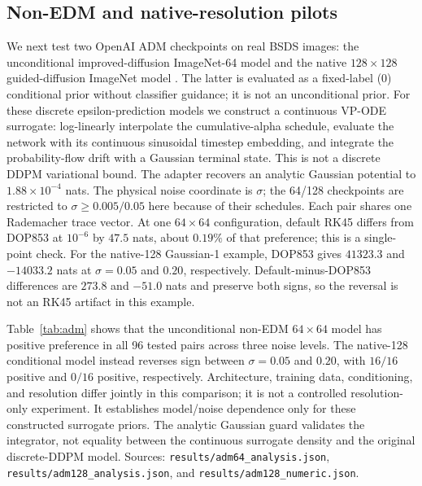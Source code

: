 \documentclass[10pt,journal]{IEEEtran}
\begin{document}
\subsection{Non-EDM and native-resolution pilots}
\label{sec:adm}

We next test two OpenAI ADM checkpoints on real BSDS images: the unconditional
improved-diffusion ImageNet-64 model \cite{nichol2021improved} and the native $128\times128$
guided-diffusion ImageNet model \cite{dhariwal2021diffusion}. The latter is evaluated as a
fixed-label (0) conditional prior without classifier guidance; it is not an unconditional prior.
For these discrete epsilon-prediction models we construct a continuous VP-ODE surrogate:
log-linearly interpolate the cumulative-alpha schedule, evaluate the network with its continuous
sinusoidal timestep embedding, and integrate the probability-flow drift with a Gaussian terminal
state. This is not a discrete DDPM variational bound. The adapter recovers an analytic Gaussian
potential to $1.88\times10^{-4}$ nats. The physical noise coordinate is $\sigma$; the 64/128
checkpoints are restricted to $\sigma\ge0.005/0.05$ here because of their schedules. Each pair
shares one Rademacher trace vector. At one $64\times64$ configuration, default RK45 differs from
DOP853 at $10^{-6}$ by $47.5$ nats, about $0.19\%$ of that preference; this is a single-point check.
For the native-128 Gaussian-1 example, DOP853 gives $41323.3$ and $-14033.2$ nats at
$\sigma=0.05$ and $0.20$, respectively. Default-minus-DOP853 differences are $273.8$ and $-51.0$
nats and preserve both signs, so the reversal is not an RK45 artifact in this example.

Table~\ref{tab:adm} shows that the unconditional non-EDM $64\times64$ model has positive preference
in all 96 tested pairs across three noise levels. The native-128 conditional model instead reverses
sign between $\sigma=0.05$ and $0.20$, with $16/16$ positive and $0/16$ positive, respectively.
Architecture, training data, conditioning, and resolution differ jointly in this comparison;
it is not a controlled resolution-only experiment. It establishes model/noise dependence only
for these constructed surrogate priors. The analytic Gaussian guard validates the integrator,
not equality between the continuous surrogate density and the original discrete-DDPM model.
Sources: \texttt{results/adm64\_analysis.json}, \texttt{results/adm128\_analysis.json}, and
\texttt{results/adm128\_numeric.json}.
\end{document}
